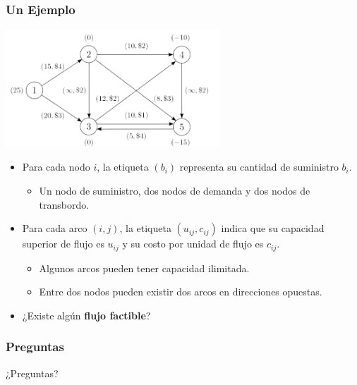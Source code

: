 \documentclass{beamer}
\begin{document}
\begin{frame}
    \frametitle{Un Ejemplo}
    
    \begin{center}
        \includegraphics[width=0.6\textwidth]{images/network_example.png} %
    \end{center}
    
    \begin{itemize}
        \item Para cada nodo $i$, la etiqueta $(b_i)$ representa su cantidad de suministro $b_i$.
        \begin{itemize}
            \item Un nodo de suministro, dos nodos de demanda y dos nodos de transbordo.
        \end{itemize}
        \item Para cada arco $(i,j)$, la etiqueta $(u_{ij}, c_{ij})$ indica que su capacidad superior de flujo es $u_{ij}$ y su costo por unidad de flujo es $c_{ij}$.
        \begin{itemize}
            \item Algunos arcos pueden tener capacidad ilimitada.
            \item Entre dos nodos pueden existir dos arcos en direcciones opuestas.
        \end{itemize}
        \item ¿Existe algún \textbf{flujo factible}?
    \end{itemize}

\end{frame}

\begin{frame}
\frametitle{Preguntas}
\centering
\Huge{¿Preguntas?}
\end{frame}
\end{document}
